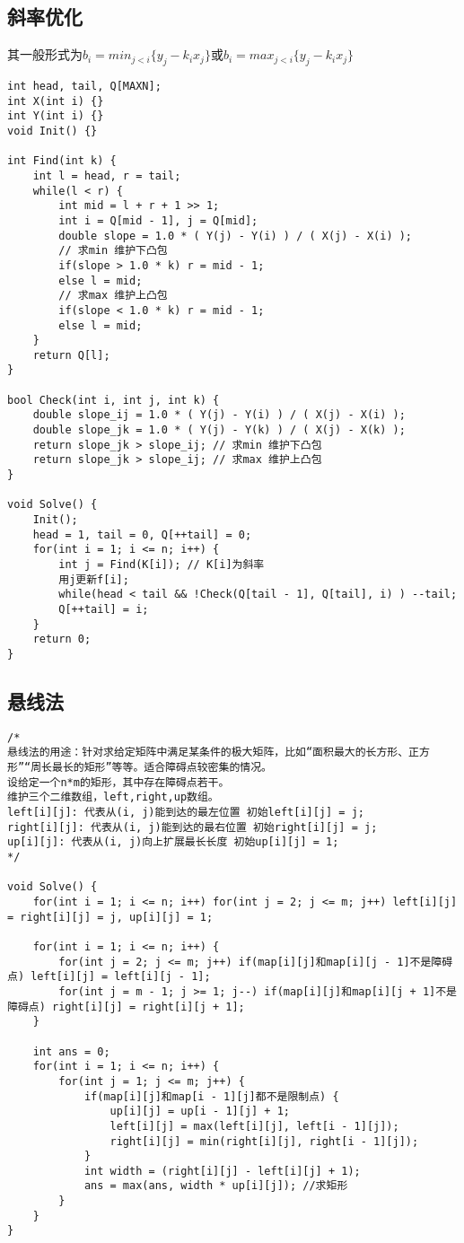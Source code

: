 \subsection{斜率优化}
其一般形式为$b_i = min_{j<i}\{y_j-k_i x_j\}$或$b_i = max_{j<i}\{y_j-k_i x_j\}$
\begin{lstlisting}
int head, tail, Q[MAXN];
int X(int i) {}
int Y(int i) {}
void Init() {}

int Find(int k) {
	int l = head, r = tail;
	while(l < r) {
		int mid = l + r + 1 >> 1;
		int i = Q[mid - 1], j = Q[mid];
		double slope = 1.0 * ( Y(j) - Y(i) ) / ( X(j) - X(i) );
		// 求min 维护下凸包 
		if(slope > 1.0 * k) r = mid - 1;
		else l = mid;
		// 求max 维护上凸包
		if(slope < 1.0 * k) r = mid - 1;
		else l = mid;
	}
	return Q[l];
}

bool Check(int i, int j, int k) {
	double slope_ij = 1.0 * ( Y(j) - Y(i) ) / ( X(j) - X(i) );
	double slope_jk = 1.0 * ( Y(j) - Y(k) ) / ( X(j) - X(k) );
	return slope_jk > slope_ij;	// 求min 维护下凸包 
	return slope_jk > slope_ij;	// 求max 维护上凸包 
}

void Solve() {
	Init();
	head = 1, tail = 0, Q[++tail] = 0;
	for(int i = 1; i <= n; i++) {
		int j = Find(K[i]);	// K[i]为斜率 
		用j更新f[i];
		while(head < tail && !Check(Q[tail - 1], Q[tail], i) ) --tail;
		Q[++tail] = i;
	}
	return 0;
}
\end{lstlisting}

\subsection{悬线法}
\begin{lstlisting}
/*
悬线法的用途：针对求给定矩阵中满足某条件的极大矩阵，比如“面积最大的长方形、正方形”“周长最长的矩形”等等。适合障碍点较密集的情况。
设给定一个n*m的矩形，其中存在障碍点若干。
维护三个二维数组，left,right,up数组。
left[i][j]: 代表从(i, j)能到达的最左位置 初始left[i][j] = j;
right[i][j]: 代表从(i, j)能到达的最右位置 初始right[i][j] = j;
up[i][j]: 代表从(i, j)向上扩展最长长度 初始up[i][j] = 1;
*/

void Solve() {
	for(int i = 1; i <= n; i++) for(int j = 2; j <= m; j++) left[i][j] = right[i][j] = j, up[i][j] = 1;

	for(int i = 1; i <= n; i++) {
		for(int j = 2; j <= m; j++) if(map[i][j]和map[i][j - 1]不是障碍点) left[i][j] = left[i][j - 1];
		for(int j = m - 1; j >= 1; j--) if(map[i][j]和map[i][j + 1]不是障碍点) right[i][j] = right[i][j + 1];
	}
	
	int ans = 0;
	for(int i = 1; i <= n; i++) {
		for(int j = 1; j <= m; j++) {
			if(map[i][j]和map[i - 1][j]都不是限制点) {
				up[i][j] = up[i - 1][j] + 1;
				left[i][j] = max(left[i][j], left[i - 1][j]);
				right[i][j] = min(right[i][j], right[i - 1][j]);
			}
			int width = (right[i][j] - left[i][j] + 1);
			ans = max(ans, width * up[i][j]); //求矩形
		}
	}
}
\end{lstlisting}

